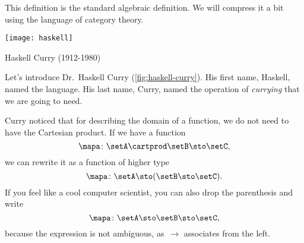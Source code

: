 This definition is the standard algebraic definition.
We will compress it a bit using the language of category theory.

\begin{marginfigure}
    \texttt{[image: haskell]}
    \caption{Haskell Curry (1912-1980)}
    \label{fig:haskell-curry}
\end{marginfigure}

Let's introduce Dr.~Haskell Curry (\cref{fig:haskell-curry}).
His first name, Haskell, named the language.
His last name, Curry, named the operation of \emph{currying} that we are going to need.

Curry noticed that for describing the domain of a function, we do not need to have the Cartesian product.
If we have a function
%
\begin{equation}
    \label{eq:currying-1}
    \mapa \colon \setA \cartprod \setB \sto \setC,
\end{equation}
%
we can rewrite it as a function of higher type
%
\begin{equation}
    \label{eq:currying-2}
    \mapa \colon \setA \sto ( \setB \sto \setC).
\end{equation}
%
If you feel like a cool computer scientist, you can also drop the parenthesis and write
%
\begin{equation}
    \label{eq:currying-3}
    \mapa \colon \setA \sto \setB \sto \setC,
\end{equation}
%
because the expression is not ambiguous, as~$\to$ associates from the left.


